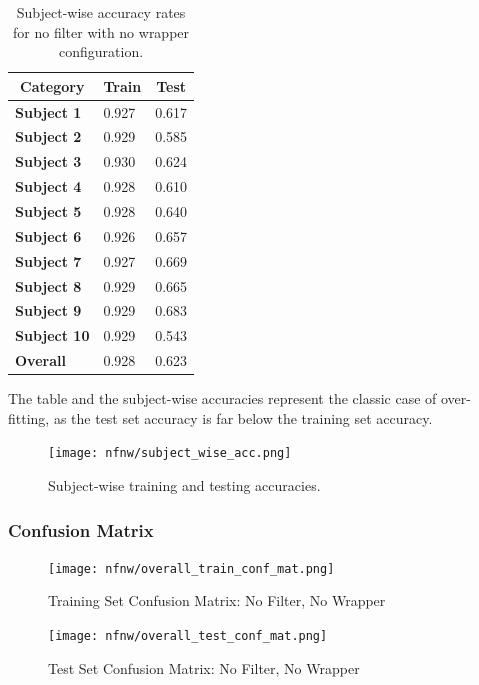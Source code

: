 \documentclass[12pt,twoside,a4paper]{article}
\begin{document}
\begin{table}[H]
\centering
\begin{tabular}{|l|l|l|}
\hline
\multicolumn{1}{|c|}{\textbf{Category}} & \multicolumn{1}{c|}{\textbf{Train}} & \multicolumn{1}{c|}{\textbf{Test}} \\ \hline
\textbf{Subject 1}  & 0.927 & 0.617 \\ \hline
\textbf{Subject 2}  & 0.929 & 0.585 \\ \hline
\textbf{Subject 3}  & 0.930 & 0.624 \\ \hline
\textbf{Subject 4}  & 0.928 & 0.610 \\ \hline
\textbf{Subject 5}  & 0.928 & 0.640 \\ \hline
\textbf{Subject 6}  & 0.926 & 0.657 \\ \hline
\textbf{Subject 7}  & 0.927 & 0.669 \\ \hline
\textbf{Subject 8}  & 0.929 & 0.665 \\ \hline
\textbf{Subject 9}  & 0.929 & 0.683 \\ \hline
\textbf{Subject 10} & 0.929 & 0.543 \\ \hline
\textbf{Overall}    & 0.928 & 0.623 \\ \hline
\end{tabular}
\caption{Subject-wise accuracy rates for no filter with no wrapper configuration.}
\label{tab:NFNWT}
\end{table}

The table and the subject-wise accuracies represent the classic case of over-fitting, as the test set accuracy is far below the training set accuracy.

\begin{figure}[H]
    \centering
    \texttt{[image: nfnw/subject\_wise\_acc.png]}
    \caption{Subject-wise training and testing accuracies.}
    \label{fig: NFW3}
\end{figure}

\subsubsection*{Confusion Matrix}

\begin{figure}[H]
    \centering
    \texttt{[image: nfnw/overall\_train\_conf\_mat.png]}
    \caption{Training Set Confusion Matrix: No Filter, No Wrapper}
    \label{fig: NFW4}
\end{figure}

\begin{figure}[H]
    \centering
    \texttt{[image: nfnw/overall\_test\_conf\_mat.png]}
    \caption{Test Set Confusion Matrix: No Filter, No Wrapper}
    \label{fig: NFW5}
\end{figure}
\end{document}
